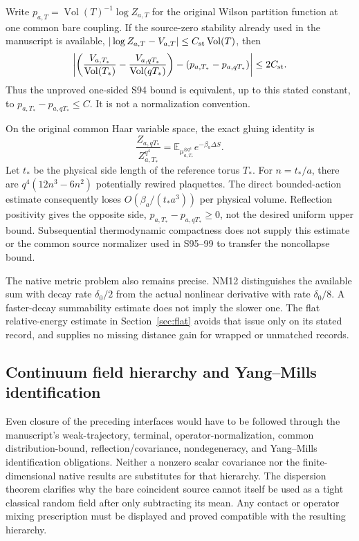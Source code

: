 \documentclass[11pt,letterpaper]{article}
\numberwithin{equation}{section}
\theoremstyle{plain}
\theoremstyle{remark}
\DeclareMathOperator{\Vol}{Vol}
\newcommand{\E}{\mathbb E}
\begin{document}
Write $p_{a,T}=\Vol(T)^{-1}\log Z_{a,T}$ for the original Wilson partition
function at one common bare coupling. If the source-zero stability already
used in the manuscript is available,
$|\log Z_{a,T}-V_{a,T}|\le C_{\rm st}\Vol(T)$, then
\begin{equation}
 \left|\left(\frac{V_{a,T_*}}{\Vol(T_*)}
             -\frac{V_{a,qT_*}}{\Vol(qT_*)}\right)
       -(p_{a,T_*}-p_{a,qT_*})\right|\le2C_{\rm st}.
 \label{eq:pressure}
\end{equation}
Thus the unproved one-sided S94 bound is equivalent, up to this stated
constant, to $p_{a,T_*}-p_{a,qT_*}\le C$. It is not a normalization convention.

On the original common Haar variable space, the exact gluing identity is
\begin{equation}
 \frac{Z_{a,qT_*}}{Z_{a,T_*}^{q^4}}
 =\E_{\mu_{a,T_*}^{\otimes q^4}}e^{-\beta_a\Delta S}.
 \label{eq:gluing}
\end{equation}
Let $t_*$ be the physical side length of the reference torus $T_*$.
For $n=t_*/a$, there are $q^4(12n^3-6n^2)$ potentially rewired plaquettes.
The direct bounded-action estimate consequently loses
$O(\beta_a/(t_*a^3))$ per physical volume. Reflection positivity gives the
opposite side, $p_{a,T_*}-p_{a,qT_*}\ge0$, not the desired uniform upper bound.
Subsequential thermodynamic compactness does not supply this estimate or the
common source normalizer used in S95--99 to transfer the noncollapse bound.

The native metric problem also remains precise. NM12 distinguishes the
available sum with decay rate $\delta_0/2$ from the actual nonlinear derivative
with rate $\delta_0/8$. A faster-decay summability estimate does not imply the
slower one. The flat relative-energy estimate in Section~\ref{sec:flat} avoids
that issue only on its stated record, and supplies no missing distance gain
for wrapped or unmatched records.

\subsection{Continuum field hierarchy and Yang--Mills identification}

Even closure of the preceding interfaces would have to be followed through
the manuscript's weak-trajectory, terminal, operator-normalization, common
distribution-bound, reflection/covariance, nondegeneracy, and Yang--Mills
identification obligations. Neither a nonzero scalar covariance nor the
finite-dimensional native results are substitutes for that hierarchy.
The dispersion theorem clarifies why the bare coincident source cannot
itself be used as a tight classical random field after only subtracting its
mean. Any contact or operator mixing prescription must be displayed and
proved compatible with the resulting hierarchy.
\end{document}
